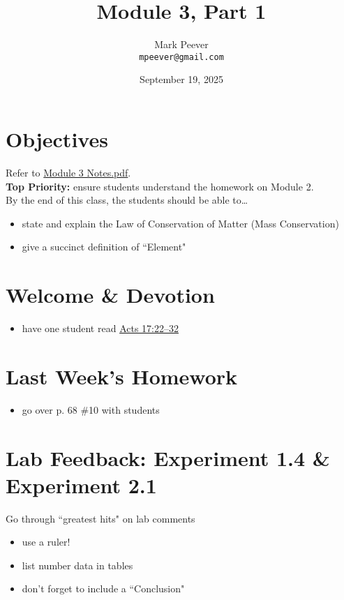 \documentclass[10pt, oneside]{article}   	%
\title{Module 3, Part 1}
\author{Mark Peever\\ \texttt{mpeever@gmail.com}}
\date{September 19, 2025}
\begin{document}
\maketitle

\section*{Objectives}
Refer to \href{https://drive.google.com/file/d/1a59ZMchwsvZDRRW7-2GuTrvZKAS8EWCE/view?usp=sharing}{Module 3 Notes.pdf}.\\

\textbf{Top Priority:} ensure students understand the homework on Module 2.\\


By the end of this class, the students should be able to\ldots
\begin{itemize}
\item state and explain the Law of Conservation of Matter (Mass Conservation)
\item give a succinct definition of ``Element"
\end{itemize}

\section*{Welcome \& Devotion}
\begin{itemize}
\item have one student read \href{https://www.biblegateway.com/passage/?search=Acts\%2017\%3A22\%E2\%80\%9332\&version=LSB}{Acts 17:22--32}
\end{itemize}

\section*{Last Week's Homework}
\begin{itemize}
\item go over p. 68 \#10 with students
\end{itemize}

\section*{Lab Feedback: Experiment 1.4 \& Experiment 2.1}

Go through ``greatest hits" on lab comments

\begin{itemize}
\item use a ruler!
\item list number data in tables
\item don't forget to include a ``Conclusion"
\end{itemize}
\end{document}
